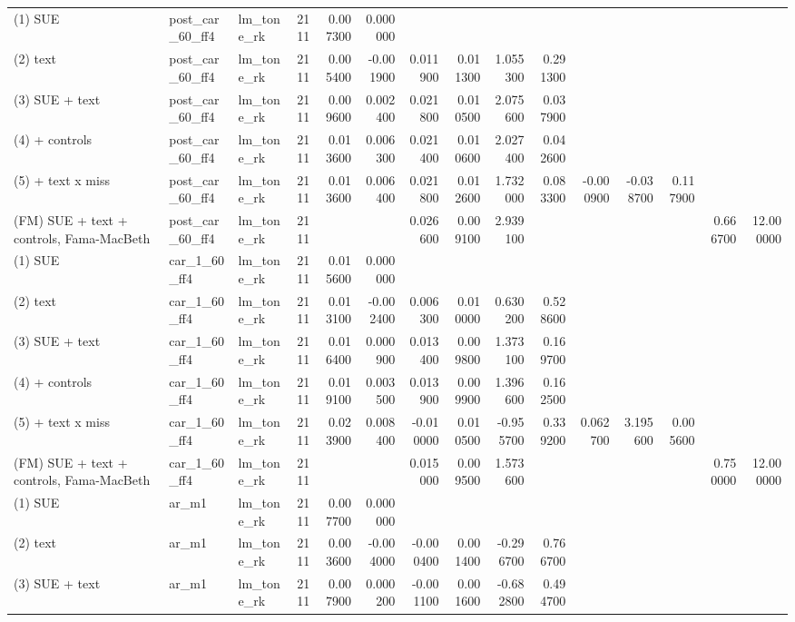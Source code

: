 \begin{table}
\begin{tabular}{lllrrrrrrrrrrrr}
(1) SUE & post\_car\_60\_ff4 & lm\_tone\_rk & 2111 & 0.007300 & 0.000000 &  &  &  &  &  &  &  &  &  \\
(2) text & post\_car\_60\_ff4 & lm\_tone\_rk & 2111 & 0.005400 & -0.001900 & 0.011900 & 0.011300 & 1.055300 & 0.291300 &  &  &  &  &  \\
(3) SUE + text & post\_car\_60\_ff4 & lm\_tone\_rk & 2111 & 0.009600 & 0.002400 & 0.021800 & 0.010500 & 2.075600 & 0.037900 &  &  &  &  &  \\
(4) + controls & post\_car\_60\_ff4 & lm\_tone\_rk & 2111 & 0.013600 & 0.006300 & 0.021400 & 0.010600 & 2.027400 & 0.042600 &  &  &  &  &  \\
(5) + text x miss & post\_car\_60\_ff4 & lm\_tone\_rk & 2111 & 0.013600 & 0.006400 & 0.021800 & 0.012600 & 1.732000 & 0.083300 & -0.000900 & -0.038700 & 0.117900 &  &  \\
(FM) SUE + text + controls, Fama-MacBeth & post\_car\_60\_ff4 & lm\_tone\_rk & 2111 &  &  & 0.026600 & 0.009100 & 2.939100 &  &  &  &  & 0.666700 & 12.000000 \\
(1) SUE & car\_1\_60\_ff4 & lm\_tone\_rk & 2111 & 0.015600 & 0.000000 &  &  &  &  &  &  &  &  &  \\
(2) text & car\_1\_60\_ff4 & lm\_tone\_rk & 2111 & 0.013100 & -0.002400 & 0.006300 & 0.010000 & 0.630200 & 0.528600 &  &  &  &  &  \\
(3) SUE + text & car\_1\_60\_ff4 & lm\_tone\_rk & 2111 & 0.016400 & 0.000900 & 0.013400 & 0.009800 & 1.373100 & 0.169700 &  &  &  &  &  \\
(4) + controls & car\_1\_60\_ff4 & lm\_tone\_rk & 2111 & 0.019100 & 0.003500 & 0.013900 & 0.009900 & 1.396600 & 0.162500 &  &  &  &  &  \\
(5) + text x miss & car\_1\_60\_ff4 & lm\_tone\_rk & 2111 & 0.023900 & 0.008400 & -0.010000 & 0.010500 & -0.955700 & 0.339200 & 0.062700 & 3.195600 & 0.005600 &  &  \\
(FM) SUE + text + controls, Fama-MacBeth & car\_1\_60\_ff4 & lm\_tone\_rk & 2111 &  &  & 0.015000 & 0.009500 & 1.573600 &  &  &  &  & 0.750000 & 12.000000 \\
(1) SUE & ar\_m1 & lm\_tone\_rk & 2111 & 0.007700 & 0.000000 &  &  &  &  &  &  &  &  &  \\
(2) text & ar\_m1 & lm\_tone\_rk & 2111 & 0.003600 & -0.004000 & -0.000400 & 0.001400 & -0.296700 & 0.766700 &  &  &  &  &  \\
(3) SUE + text & ar\_m1 & lm\_tone\_rk & 2111 & 0.007900 & 0.000200 & -0.001100 & 0.001600 & -0.682800 & 0.494700 &  &  &  &  &  \\

\end{tabular}
\end{table}
